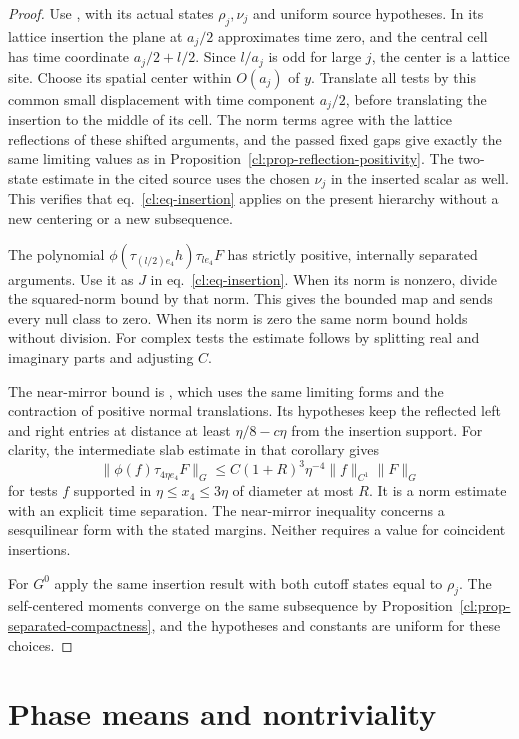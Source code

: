 \documentclass[11pt,letterpaper,reqno]{amsart}
\numberwithin{equation}{section}
\renewcommand{\eqref}[1]{\textup{eq.~\ref{#1}}}
\theoremstyle{definition}
\theoremstyle{remark}
\begin{document}
\begin{proof}
Use \cite[Proposition 11.2]{SI}, with its actual states
\(\rho_j,\nu_j\) and uniform source hypotheses. In its
lattice insertion the plane at \(a_j/2\) approximates time
zero, and the central cell has time coordinate \(a_j/2+l/2\).
Since \(l/a_j\) is odd for large \(j\), the center is a
lattice site. Choose its spatial center within \(O(a_j)\) of
\(y\). Translate all tests by this common small displacement
with time component \(a_j/2\), before translating the insertion
to the middle of its cell. The norm terms agree with the
lattice reflections of these shifted arguments, and the
passed fixed gaps give exactly the same limiting values as
in Proposition~\ref{cl:prop-reflection-positivity}.
The two-state estimate in the cited source uses the chosen \(\nu_j\) in the
inserted scalar as well. This verifies that
\eqref{cl:eq-insertion} applies on the present hierarchy
without a new centering or a new subsequence.

The polynomial \(\phi(\tau_{(l/2)e_4}h)\tau_{le_4}F\)
has strictly positive, internally separated arguments.
Use it as \(J\) in \eqref{cl:eq-insertion}.
When its norm is nonzero, divide the squared-norm bound by
that norm. This gives the bounded map and sends every null
class to zero. When its norm is zero the same norm bound
holds without division. For complex tests the estimate follows
by splitting real and imaginary parts and adjusting \(C\).

The near-mirror bound is \cite[Corollary 11.3]{SI}, which
uses the same limiting forms and the contraction of positive
normal translations. Its hypotheses keep the reflected left
and right entries at distance at least \(\eta/8-c\eta\)
from the insertion support. For clarity, the intermediate
slab estimate in that corollary gives
\[
 \|\phi(f)\tau_{4\eta e_4}F\|_G
 \le C(1+R)^3\eta^{-4}\|f\|_{C^1}\|F\|_G
\]
for tests \(f\) supported in \(\eta\le x_4\le3\eta\)
of diameter at most \(R\). It is a norm estimate with an
explicit time separation. The near-mirror inequality concerns
a sesquilinear form with the stated margins. Neither requires
a value for coincident insertions.

For \(G^0\) apply the same insertion result with both cutoff states
equal to \(\rho_j\). The self-centered moments converge on
the same subsequence by
Proposition~\ref{cl:prop-separated-compactness}, and the
hypotheses and constants are uniform for these choices.
\end{proof}

\section{Phase means and nontriviality}
\label{cl:sec-mean}
\end{document}
